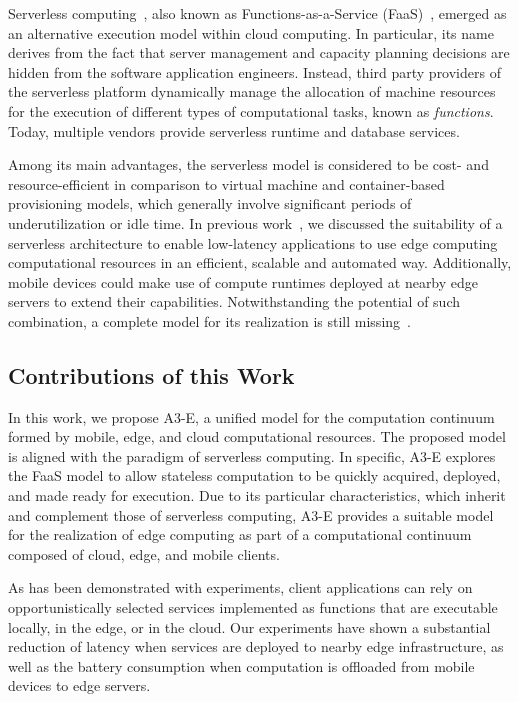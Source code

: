 Serverless computing~\cite{roberts2016serverless, hendrickson2016serverless}, also known as Functions-as-a-Service (FaaS)~\cite{mateosFaas17}, emerged as an alternative execution model within cloud computing. In particular, its name derives from the fact that server management and capacity planning decisions are hidden from the software application engineers. Instead, third party providers of the serverless platform dynamically manage the allocation of machine resources for the execution of different types of computational tasks, known as \textit{functions}. Today, multiple vendors provide serverless runtime and database services. 

Among its main advantages, the serverless model is considered to be cost- and resource-efficient in comparison to virtual machine and container-based provisioning models, which generally involve significant periods of underutilization or idle time. In previous work~\cite{GarrigaMendonca2017}, we discussed the suitability of a serverless architecture to enable low-latency applications to use edge computing computational resources in an efficient, scalable and automated way. Additionally, mobile devices could make use of compute runtimes deployed at nearby edge servers to extend their capabilities. Notwithstanding the potential of such combination, a complete model for its realization is still missing~\cite{NasticServerlessEdge17}. 

\subsection{Contributions of this Work}

In this work, we propose A3-E, a unified model for the computation continuum formed by mobile, edge, and cloud computational resources. The proposed model is aligned with the paradigm of serverless computing. In specific, A3-E explores the FaaS model to allow stateless computation to be quickly acquired, deployed, and made ready for execution. Due to its particular characteristics, which inherit and complement those of serverless computing, A3-E provides a suitable model for the realization of edge computing as part of a  computational continuum composed of cloud, edge, and mobile clients.

As has been demonstrated with experiments, client applications can rely on opportunistically selected services implemented as functions that are executable locally, in the edge, or in the cloud. Our experiments have shown a substantial reduction of latency when services are deployed to nearby edge infrastructure, as well as the battery consumption when computation is offloaded from mobile devices to edge servers.

